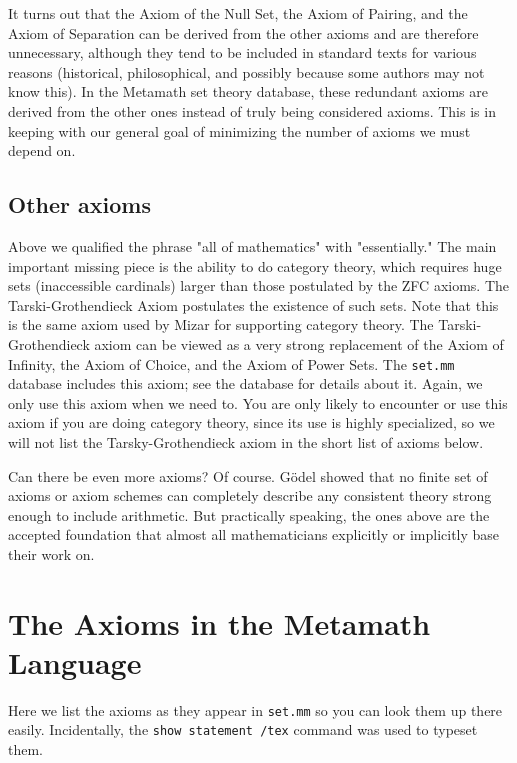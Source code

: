 It turns out that the Axiom of the Null Set, the Axiom of Pairing, and the
Axiom of Separation can be derived from the other axioms and are therefore
unnecessary, although they tend to be included in standard texts for various
reasons (historical, philosophical, and possibly because some authors may not
know this).  In the Metamath set theory database, these
redundant axioms are derived from the other ones instead of truly
being considered axioms.
This is in keeping with our general goal of minimizing the number of
axioms we must depend on.

\subsection{Other axioms}

Above we qualified the phrase "all of mathematics" with "essentially."
The main important missing piece is the ability to do category theory,
which requires huge sets (inaccessible cardinals) larger than those
postulated by the ZFC axioms. The Tarski-Grothendieck Axiom postulates
the existence of such sets.
Note that this is the same axiom used by Mizar for supporting
category theory.
The Tarski-Grothendieck axiom
can be viewed as a very strong replacement of the Axiom of Infinity,
the Axiom of Choice, and the Axiom of Power Sets.
The \texttt{set.mm} database includes this axiom; see the database
for details about it.
Again, we only use this axiom when we need to.
You are only likely to encounter or use this axiom if you are doing
category theory, since its use is highly specialized,
so we will not list the Tarsky-Grothendieck axiom
in the short list of axioms below.

Can there be even more axioms?
Of course.
G\"{o}del showed that no finite set of axioms or axiom schemes can completely
describe any consistent theory strong enough to include arithmetic.
But practically speaking, the ones above are the accepted foundation that
almost all mathematicians explicitly or implicitly base their work on.

\section{The Axioms in the Metamath Language}\label{metaaxioms}

Here we list the axioms as they appear in
\texttt{set.mm} so you can
look them up there easily.  Incidentally, the \texttt{show statement
/tex} command was used to
typeset them.

